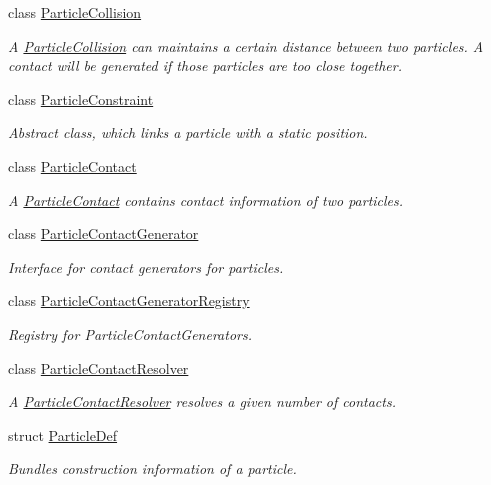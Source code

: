 \begin{DoxyCompactItemize}
class \mbox{\hyperlink{classr3_1_1_particle_collision}{Particle\+Collision}}
\begin{DoxyCompactList}\small\item\em A \mbox{\hyperlink{classr3_1_1_particle_collision}{Particle\+Collision}} can maintains a certain distance between two particles. A contact will be generated if those particles are too close together. \end{DoxyCompactList}\item 
class \mbox{\hyperlink{classr3_1_1_particle_constraint}{Particle\+Constraint}}
\begin{DoxyCompactList}\small\item\em Abstract class, which links a particle with a static position. \end{DoxyCompactList}\item 
class \mbox{\hyperlink{classr3_1_1_particle_contact}{Particle\+Contact}}
\begin{DoxyCompactList}\small\item\em A \mbox{\hyperlink{classr3_1_1_particle_contact}{Particle\+Contact}} contains contact information of two particles. \end{DoxyCompactList}\item 
class \mbox{\hyperlink{classr3_1_1_particle_contact_generator}{Particle\+Contact\+Generator}}
\begin{DoxyCompactList}\small\item\em Interface for contact generators for particles. \end{DoxyCompactList}\item 
class \mbox{\hyperlink{classr3_1_1_particle_contact_generator_registry}{Particle\+Contact\+Generator\+Registry}}
\begin{DoxyCompactList}\small\item\em Registry for Particle\+Contact\+Generators. \end{DoxyCompactList}\item 
class \mbox{\hyperlink{classr3_1_1_particle_contact_resolver}{Particle\+Contact\+Resolver}}
\begin{DoxyCompactList}\small\item\em A \mbox{\hyperlink{classr3_1_1_particle_contact_resolver}{Particle\+Contact\+Resolver}} resolves a given number of contacts. \end{DoxyCompactList}\item 
struct \mbox{\hyperlink{structr3_1_1_particle_def}{Particle\+Def}}
\begin{DoxyCompactList}\small\item\em Bundles construction information of a particle. \end{DoxyCompactList}\item 

\end{DoxyCompactItemize}
